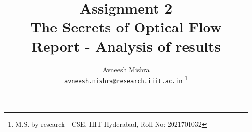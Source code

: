 

{
   \fancyhf{}
   \renewcommand{\headrulewidth}{0pt} %
}

\title{Assignment 2 \\
    \Large The Secrets of Optical Flow \\
    \small Report - Analysis of results}

\author{
    Avneesh Mishra \\
    \texttt{avneesh.mishra@research.iiit.ac.in}
    \thanks{M.S. by research - CSE, IIIT Hyderabad, Roll No: 2021701032}
}


    \maketitle
    \thispagestyle{fancy_tr_rno}
    \tableofcontents
    \pagebreak
    

